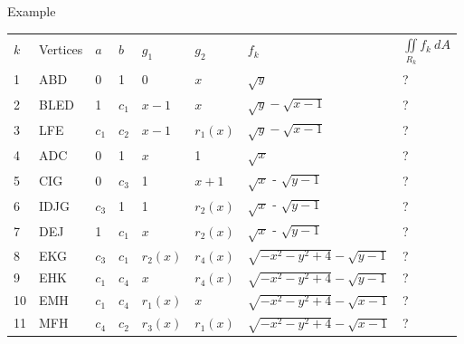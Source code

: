 \documentclass[a4paper,10pt]{article}
\begin{document}
\begin{section}{Example}
\begin{table}
\begin{center}
\begin{tabular}{|l l l l l l l l|}
  $k$ & Vertices & $a$ & $b$  & $g_1$ & $g_2$ & $f_k$ & $\iint\limits_{\!R_k} f_k~dA$\\
  1 & ABD & 0 & 1& 0 & $x$ & $\sqrt{y}$ & ?\\
  2 & BLED& 1& $c_1$ & $x-1$ & $x$ & $\sqrt{y} - \sqrt{x-1}$& ?\\
  3 & LFE& $c_1$ & $c_2$ & $x-1$ & $r_1(x)$&$\sqrt{y} - \sqrt{x-1}$&?\\
  4 & ADC& 0 & 1 & $x$ & 1 & $\sqrt{x}$ & ?\\
  5 & CIG& 0 & $c_3$ & 1 & $x+1$ & $\sqrt{x}$ - $\sqrt{y-1}$ & ? \\
  6 & IDJG& $c_3$ & 1 & 1 & $r_2(x)$ & $\sqrt{x}$ - $\sqrt{y-1}$&?\\
  7 & DEJ& 1& $c_1$& $x$ & $r_2(x)$ & $\sqrt{x}$ - $\sqrt{y-1}$&? \\ 
  8 & EKG& $c_3$& $c_1$& $r_2(x)$ & $r_4(x)$ & $\sqrt{-x^2-y^2+4}-\sqrt{y-1}$&?\\ 
  9 & EHK& $c_1$& $c_4$& $x$& $r_4(x)$ & $\sqrt{-x^2-y^2+4}-\sqrt{y-1}$&?\\
  10& EMH& $c_1$& $c_4$& $r_1(x)$& $x$ & $\sqrt{-x^2-y^2+4}-\sqrt{x-1}$&?\\
  11& MFH& $c_4$& $c_2$& $r_3(x)$& $r_1(x)$ & $\sqrt{-x^2-y^2+4}-\sqrt{x-1}$&?\\ 
\end{tabular}
 
\end{center}

\end{table}


 
\end{section}
\end{document}
